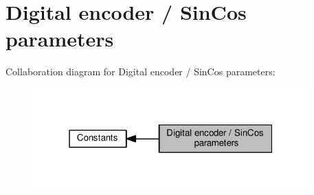 \hypertarget{group__IL__CONST__DENC__SINCOS__PARAM}{}\section{Digital encoder / Sin\+Cos parameters}
\label{group__IL__CONST__DENC__SINCOS__PARAM}
Collaboration diagram for Digital encoder / Sin\+Cos parameters\+:\nopagebreak
\begin{figure}[H]
\begin{center}
\leavevmode
\includegraphics[width=301pt]{group__IL__CONST__DENC__SINCOS__PARAM}
\end{center}
\end{figure}
